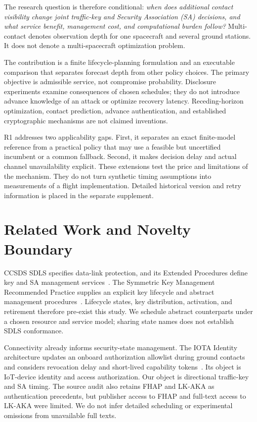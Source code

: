 \documentclass[conference]{IEEEtran}
\begin{document}
The research question is therefore conditional: \emph{when does additional contact visibility change joint traffic-key and Security Association (SA) decisions, and what service benefit, management cost, and computational burden follow?} Multi-contact denotes observation depth for one spacecraft and several ground stations. It does not denote a multi-spacecraft optimization problem.

The contribution is a finite lifecycle-planning formulation and an executable comparison that separates forecast depth from other policy choices. The primary objective is admissible service, not compromise probability. Disclosure experiments examine consequences of chosen schedules; they do not introduce advance knowledge of an attack or optimize recovery latency. Receding-horizon optimization, contact prediction, advance authentication, and established cryptographic mechanisms are not claimed inventions.

R1 addresses two applicability gaps. First, it separates an exact finite-model reference from a practical policy that may use a feasible but uncertified incumbent or a common fallback. Second, it makes decision delay and actual channel unavailability explicit. These extensions test the price and limitations of the mechanism. They do not turn synthetic timing assumptions into measurements of a flight implementation. Detailed historical version and retry information is placed in the separate supplement.

\section{Related Work and Novelty Boundary}
CCSDS SDLS specifies data-link protection, and its Extended Procedures define key and SA management services~\cite{sdls,ep}. The Symmetric Key Management Recommended Practice supplies an explicit key lifecycle and abstract management procedures~\cite{skm}. Lifecycle states, key distribution, activation, and retirement therefore pre-exist this study. We schedule abstract counterparts under a chosen resource and service model; sharing state names does not establish SDLS conformance.

Connectivity already informs security-state management. The IOTA Identity architecture updates an onboard authorization allowlist during ground contacts and considers revocation delay and short-lived capability tokens~\cite{iota}. Its object is IoT-device identity and access authorization. Our object is directional traffic-key and SA timing. The source audit also retains FHAP and LK-AKA as authentication precedents, but publisher access to FHAP and full-text access to LK-AKA were limited. We do not infer detailed scheduling or experimental omissions from unavailable full texts.
\end{document}
